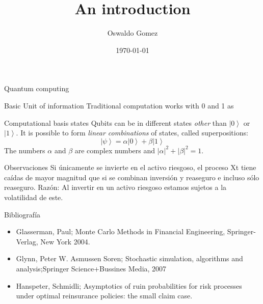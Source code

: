 \documentclass{beamer}
\title[Quantum Computing]{An introduction}
\author{Oswaldo Gomez}
\institute{AI Engineering}
\date{\today}
\newcommand{\ket}[1]{\left| #1 \right>} %
\begin{document}
\begin{frame}{Quantum computing}
\titlepage
\end{frame}

\begin{frame}{Basic Unit of information}
\justifying
Traditional computation works with $0$ and 1 as 

\end{frame}

\begin{frame}{Computational basis states}
\justifying
Qubits can be in different states \textit{other} than $\ket{0}$ or $\ket{1}$. It is possible to form \textit{linear combinations} of states, called superpositions:
$$\ket{\psi}= \alpha \ket{0} + \beta \ket{1}$$
The numbers $\alpha$ and $\beta$ are complex numbers and ${|\alpha|}^2+|\beta|^2=1$.  
\end{frame}

\begin{frame}{Observaciones}
Si únicamente se invierte en el activo riesgoso, el proceso Xt tiene caídas de mayor magnitud que si se combinan inversión y reaseguro e incluso sólo reaseguro.
\newline
\newline
Razón:  Al invertir en un activo riesgoso estamos sujetos a la volatilidad de este.
\end{frame}




\begin{frame}{Bibliografía}
\begin{itemize}
\item Glasserman, Paul; Monte Carlo Methods in Financial Engineering, Springer-Verlag, New York 2004.
\newline
\item Glynn, Peter W. Asmussen Soren; Stochastic simulation, algorithms and analysis;Springer Science+Bussines Media, 2007
\newline
\item Hanspeter, Schmidli; Asymptotics of ruin probabilities for risk processes under optimal reinsurance policies: the small claim case.
\end{itemize}






\end{frame}
\end{document}
